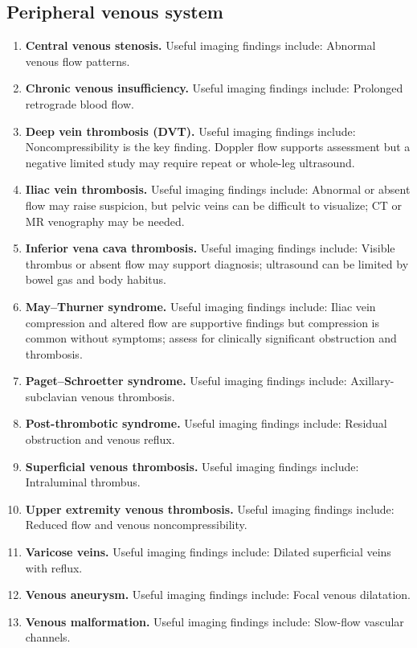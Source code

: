 \subsection{Peripheral venous system}
\begin{enumerate}[leftmargin=*,itemsep=0.45em,topsep=0.4em]
\item \textbf{Central venous stenosis.} Useful imaging findings include: Abnormal venous flow patterns.
\item \textbf{Chronic venous insufficiency.} Useful imaging findings include: Prolonged retrograde blood flow.
\item \textbf{Deep vein thrombosis (DVT).} Useful imaging findings include: Noncompressibility is the key finding. Doppler flow supports assessment but a negative limited study may require repeat or whole-leg ultrasound.
\item \textbf{Iliac vein thrombosis.} Useful imaging findings include: Abnormal or absent flow may raise suspicion, but pelvic veins can be difficult to visualize; CT or MR venography may be needed.
\item \textbf{Inferior vena cava thrombosis.} Useful imaging findings include: Visible thrombus or absent flow may support diagnosis; ultrasound can be limited by bowel gas and body habitus.
\item \textbf{May--Thurner syndrome.} Useful imaging findings include: Iliac vein compression and altered flow are supportive findings but compression is common without symptoms; assess for clinically significant obstruction and thrombosis.
\item \textbf{Paget--Schroetter syndrome.} Useful imaging findings include: Axillary-subclavian venous thrombosis.
\item \textbf{Post-thrombotic syndrome.} Useful imaging findings include: Residual obstruction and venous reflux.
\item \textbf{Superficial venous thrombosis.} Useful imaging findings include: Intraluminal thrombus.
\item \textbf{Upper extremity venous thrombosis.} Useful imaging findings include: Reduced flow and venous noncompressibility.
\item \textbf{Varicose veins.} Useful imaging findings include: Dilated superficial veins with reflux.
\item \textbf{Venous aneurysm.} Useful imaging findings include: Focal venous dilatation.
\item \textbf{Venous malformation.} Useful imaging findings include: Slow-flow vascular channels.
\end{enumerate}

